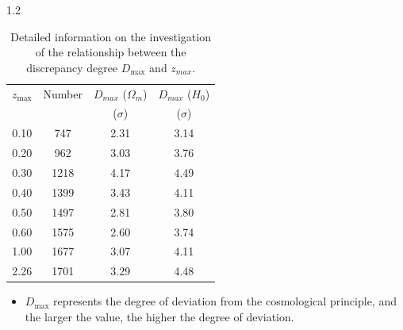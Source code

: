 \documentclass{aa}
\begin{document}
\begin{table}\footnotesize
        \caption{Detailed information on the investigation of the relationship between the discrepancy degree $D_\mathrm{max}$ and $z_{max}$. \label{TT}}
        \centering
        \begin{spacing}{1.2}
                \begin{tabular}{cccc}
                        \hline\hline
                        $z_\mathrm{max}$ & Number & $D_{max}$ ($\Omega_{m}$)& $D_{max}$ ($H_{0}$)  \\
                        &  & ($\sigma$) & ($\sigma$)  \\
                        \hline
                        0.10 & 747  & 2.31 & 3.14 \\
                        0.20 & 962  & 3.03 & 3.76 \\
                        0.30 & 1218 & 4.17 & 4.49 \\
                        0.40 & 1399 & 3.43 & 4.11 \\
                        0.50 & 1497 & 2.81 & 3.80 \\
                        0.60 & 1575 & 2.60 & 3.74 \\
                        1.00 & 1677 & 3.07 & 4.11 \\
                        2.26 & 1701 & 3.29 & 4.48 \\
                        
                        \hline\hline
                \end{tabular}
                \begin{itemize} 
                        \tiny
                        \item[*] $D_\mathrm{max}$ represents the degree of deviation from the cosmological principle, and the larger the value, the higher the degree of deviation.
                \end{itemize}
        \end{spacing}
\end{table}
\end{document}
